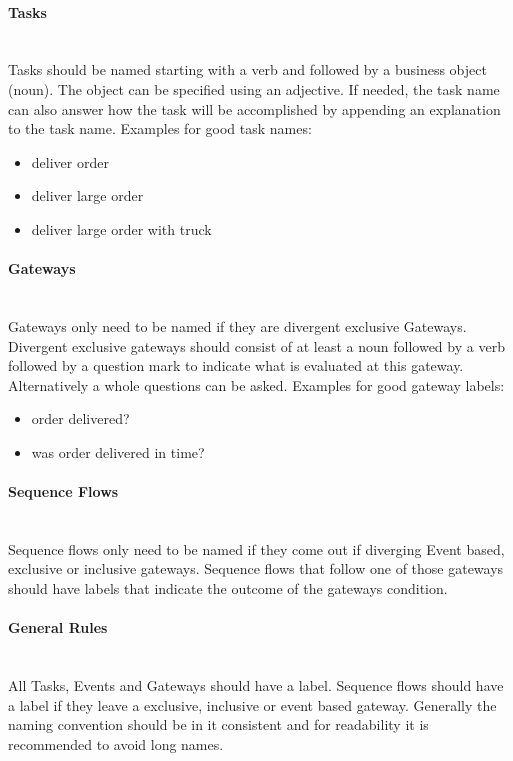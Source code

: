 \paragraph{Tasks}~\\
Tasks should be named starting with a verb and followed by a business object (noun). The object can be specified using an adjective. If needed, the task name can also answer how the task will be accomplished by appending an explanation to the task name. Examples for good task names:
\begin{itemize}
	\item deliver order
	\item deliver large order
	\item deliver large order with truck 
\end{itemize}

\paragraph{Gateways}~\\
Gateways only need to be named if they are divergent exclusive Gateways. Divergent exclusive gateways should consist of at least a noun followed by a verb followed by a question mark to indicate what is evaluated at this gateway. Alternatively a whole questions can be asked. Examples for good gateway labels:
\begin{itemize}
	\item order delivered?
	\item was order delivered in time?
\end{itemize}

\paragraph{Sequence Flows}~\\
Sequence flows only need to be named if they come out if diverging Event based, exclusive or inclusive gateways. Sequence flows that follow one of those gateways should have labels that indicate the outcome of the gateways condition. 

\paragraph{General Rules}~\\
All Tasks, Events and Gateways should have a label. Sequence flows should have a label if they leave a exclusive, inclusive or event based gateway. Generally the naming convention should be in it consistent and for readability it is recommended to avoid long names. 